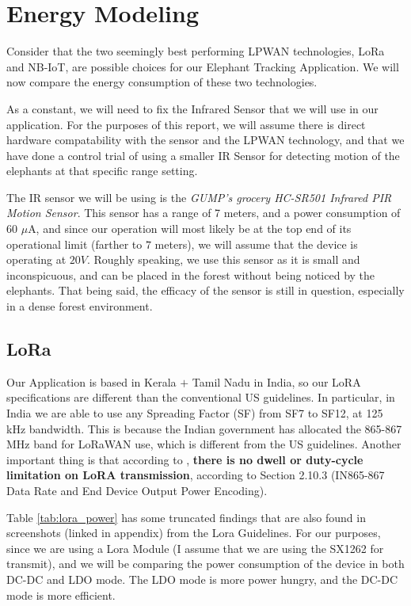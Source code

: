 \section{Energy Modeling}
\label{sec:EnergyModeling}
Consider that the two seemingly best performing LPWAN technologies, LoRa and NB-IoT, are possible choices for our Elephant Tracking Application. We will now compare the energy consumption of these two technologies. 

As a constant, we will need to fix the Infrared Sensor that we will use in our application. For the purposes of this report, we will assume there is direct hardware compatability with the sensor and the LPWAN technology, and that we have done a control trial of using a smaller IR Sensor for detecting motion of the elephants at that specific range setting. 

The IR sensor we will be using is the \textit{GUMP's grocery HC-SR501 Infrared PIR Motion Sensor}\cite{GumpSensor}. This sensor has a range of 7 meters, and a power consumption of 60 $\mu$A, and since our operation will most likely be at the top end of its operational limit (farther to $7$ meters), we will assume that the device is operating at $20V$. Roughly speaking, we use this sensor as it is small and inconspicuous, and can be placed in the forest without being noticed by the elephants. That being said, the efficacy of the sensor is still in question, especially in a dense forest environment.\\
% 
\subsection{LoRa}
\label{sec:LoRa}
Our Application is based in Kerala $ + $ Tamil Nadu in India, so our LoRA specifications are different than the conventional US guidelines. In particular, in India we are able to use any Spreading Factor (SF) from SF7 to SF12, at 125 kHz bandwidth. This is because the Indian government has allocated the 865-867 MHz band for LoRaWAN use, which is different from the US guidelines. Another important thing is that according to \cite{loraGuidelines}, \textbf{there is no dwell or duty-cycle limitation on LoRA transmission}, according to Section 2.10.3 (IN865-867 Data Rate and End Device Output Power Encoding).


Table \ref{tab:lora_power} has some truncated findings that are also found in screenshots (linked in appendix) from the Lora Guidelines. For our purposes, since we are using a Lora Module (I assume that we are using the SX1262 for transmit), and we will be comparing the power consumption of the device in both DC-DC and LDO mode. The LDO mode is more power hungry, and the DC-DC mode is more efficient. 

